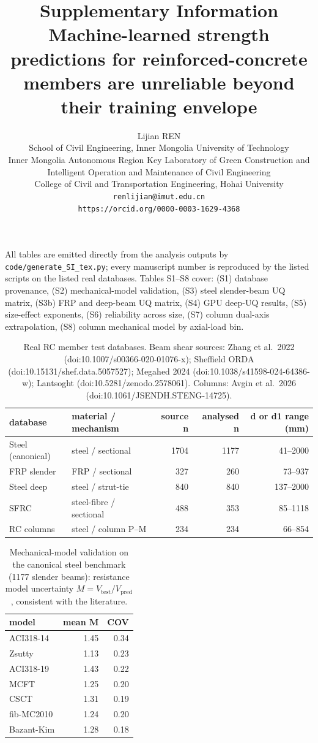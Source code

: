 \documentclass[11pt]{article}
\title{Supplementary Information\\\large Machine-learned strength predictions for reinforced-concrete members are unreliable beyond their training envelope}
\author{Lijian REN\\School of Civil Engineering, Inner Mongolia University of Technology\\Inner Mongolia Autonomous Region Key Laboratory of Green Construction and\\Intelligent Operation and Maintenance of Civil Engineering\\College of Civil and Transportation Engineering, Hohai University\\\texttt{renlijian@imut.edu.cn}\\\texttt{https://orcid.org/0000-0003-1629-4368}}\date{}
\begin{document}
\maketitle
\noindent All tables are emitted directly from the analysis outputs by \texttt{code/generate\_SI\_tex.py}; every manuscript number is reproduced by the listed scripts on the listed real databases.
Tables S1--S8 cover: (S1) database provenance, (S2) mechanical-model validation, (S3) steel slender-beam UQ matrix, (S3b) FRP and deep-beam UQ matrix, (S4) GPU deep-UQ results, (S5) size-effect exponents, (S6) reliability across size, (S7) column dual-axis extrapolation, (S8) column mechanical model by axial-load bin.

\begin{table}[h]\centering\small
\caption{Real RC member test databases. Beam shear sources: Zhang et al.\ 2022 (doi:10.1007/s00366-020-01076-x); Sheffield ORDA (doi:10.15131/shef.data.5057527); Megahed 2024 (doi:10.1038/s41598-024-64386-w); Lantsoght (doi:10.5281/zenodo.2578061). Columns: Avgin et al.\ 2026 (doi:10.1061/JSENDH.STENG-14725).}\label{tab:s1}
\begin{tabular}{llrrr}
\toprule
\textbf{database} & \textbf{material / mechanism} & \textbf{source n} & \textbf{analysed n} & \textbf{d or d1 range (mm)} \\
\midrule
Steel (canonical) & steel / sectional & 1704 & 1177 & 41--2000 \\
FRP slender & FRP / sectional & 327 & 260 & 73--937 \\
Steel deep & steel / strut-tie & 840 & 840 & 137--2000 \\
SFRC & steel-fibre / sectional & 488 & 353 & 85--1118 \\
RC columns & steel / column P--M & 234 & 234 & 66--854 \\
\bottomrule
\end{tabular}
\end{table}

\begin{table}[h]\centering\small
\caption{Mechanical-model validation on the canonical steel benchmark (1177 slender beams): resistance model uncertainty $M=V_{\mathrm{test}}/V_{\mathrm{pred}}$, consistent with the literature.}\label{tab:s2}
\begin{tabular}{lrr}
\toprule
\textbf{model} & \textbf{mean M} & \textbf{COV} \\
\midrule
ACI318-14 & 1.45 & 0.34 \\
Zsutty & 1.13 & 0.23 \\
ACI318-19 & 1.43 & 0.22 \\
MCFT & 1.25 & 0.20 \\
CSCT & 1.31 & 0.19 \\
fib-MC2010 & 1.24 & 0.20 \\
Bazant-Kim & 1.28 & 0.18 \\
\bottomrule
\end{tabular}
\end{table}
\end{document}
